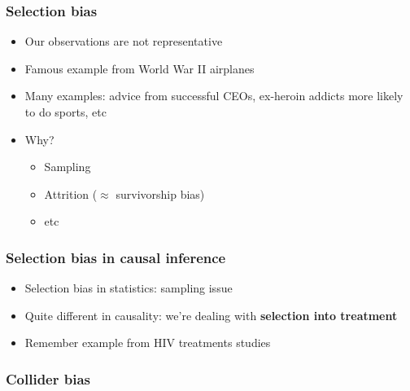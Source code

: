 \documentclass[aspectratio=43]{beamer}
\begin{document}
\begin{frame}
\frametitle{Selection bias}
\centering

\begin{itemize}[<+->]
  \item Our observations are not representative
  \item Famous example from World War II airplanes
  \item Many examples: advice from successful CEOs, ex-heroin addicts more likely to do sports, etc
  \item Why?
  \begin{itemize}
    \item Sampling
    \item Attrition ($\approx$ survivorship bias)
    \item etc
  \end{itemize}
\end{itemize}

\end{frame}


\begin{frame}
\frametitle{Selection bias in causal inference}
\centering

\begin{itemize}
  \item Selection bias in statistics: sampling issue
  \item Quite different in causality: we're dealing with \textbf{selection into treatment}
  \item Remember example from HIV treatments studies
\end{itemize}

\end{frame}

\begin{frame}
\frametitle{Collider bias}
\centering


\end{frame}
\end{document}
